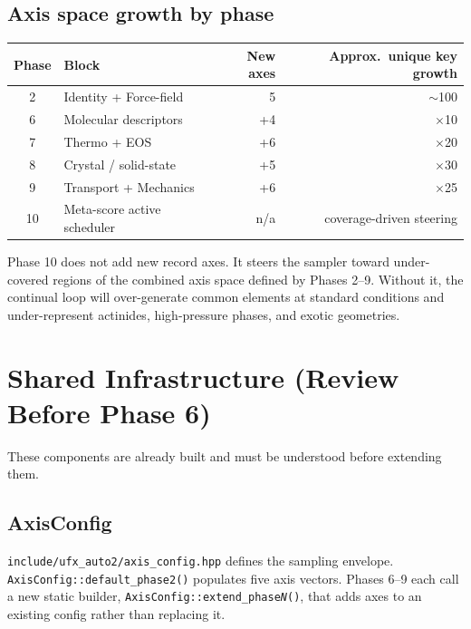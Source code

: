 \documentclass[11pt, a4paper]{article}
\begin{document}
\subsection{Axis space growth by phase}

\begin{center}
\begin{tabular}{clrr}
\toprule
\textbf{Phase} & \textbf{Block} & \textbf{New axes} & \textbf{Approx.\ unique key growth} \\
\midrule
2  & Identity + Force-field          & 5   & $\sim$100 \\
6  & Molecular descriptors           & +4  & $\times$10 \\
7  & Thermo + EOS                    & +6  & $\times$20 \\
8  & Crystal / solid-state           & +5  & $\times$30 \\
9  & Transport + Mechanics           & +6  & $\times$25 \\
10 & Meta-score active scheduler     & n/a & coverage-driven steering \\
\bottomrule
\end{tabular}
\end{center}

\begin{phasebox}
Phase 10 does not add new record axes.  It steers the sampler toward under-covered
regions of the combined axis space defined by Phases 2--9.  Without it, the
continual loop will over-generate common elements at standard conditions and
under-represent actinides, high-pressure phases, and exotic geometries.
\end{phasebox}

\section{Shared Infrastructure (Review Before Phase 6)}

These components are already built and must be understood before extending them.

\subsection{AxisConfig}

\texttt{include/ufx\_auto2/axis\_config.hpp} defines the sampling envelope.
\texttt{AxisConfig::default\_phase2()} populates five axis vectors.  Phases 6--9
each call a new static builder, \texttt{AxisConfig::extend\_phase\textit{N}()}, that
adds axes to an existing config rather than replacing it.
\end{document}
